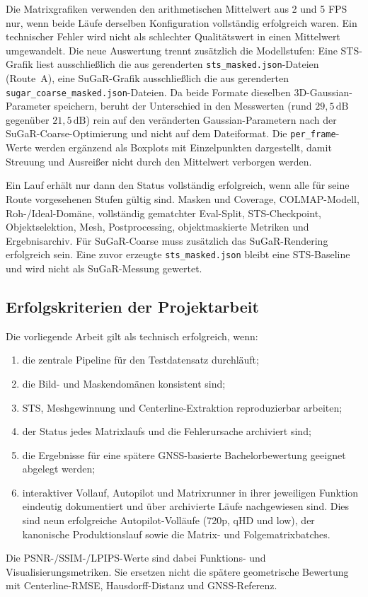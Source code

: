 Die Matrixgrafiken verwenden den arithmetischen Mittelwert aus 2 und 5 FPS nur,
wenn beide Läufe derselben Konfiguration vollständig erfolgreich waren. Ein
technischer Fehler wird nicht als schlechter Qualitätswert in einen Mittelwert
umgewandelt. Die neue Auswertung trennt zusätzlich die Modellstufen: Eine
STS-Grafik liest ausschließlich die aus  gerenderten
\texttt{sts\_masked.json}-Dateien (Route~A), eine SuGaR-Grafik ausschließlich die
aus  gerenderten \texttt{sugar\_coarse\_masked.json}-Dateien. Da
beide Formate dieselben 3D-Gaussian-Parameter speichern, beruht der Unterschied
in den Messwerten (rund $29{,}5\,\mathrm{dB}$ gegenüber $21{,}5\,\mathrm{dB}$)
rein auf den veränderten Gaussian-Parametern nach der SuGaR-Coarse-Optimierung und
nicht auf dem Dateiformat. Die \texttt{per\_frame}-Werte werden ergänzend als
Boxplots mit Einzelpunkten dargestellt, damit Streuung und Ausreißer nicht durch
den Mittelwert verborgen werden.

Ein Lauf erhält nur dann den Status vollständig erfolgreich, wenn alle für
seine Route vorgesehenen Stufen gültig sind. Masken und Coverage,
COLMAP-Modell, Roh-/Ideal-Domäne, vollständig gematchter Eval-Split,
STS-Checkpoint, Objektselektion, Mesh, Postprocessing, objektmaskierte Metriken
und Ergebnisarchiv. Für SuGaR-Coarse muss zusätzlich das SuGaR-Rendering
erfolgreich sein. Eine zuvor erzeugte \texttt{sts\_masked.json} bleibt eine
STS-Baseline und wird nicht als SuGaR-Messung gewertet.

\subsection{Erfolgskriterien der Projektarbeit}

Die vorliegende Arbeit gilt als technisch erfolgreich, wenn:

\begin{enumerate}
  \item die zentrale Pipeline für den Testdatensatz durchläuft;
  \item die Bild- und Maskendomänen konsistent sind;
  \item STS, Meshgewinnung und Centerline-Extraktion reproduzierbar arbeiten;
  \item der Status jedes Matrixlaufs und die Fehlerursache archiviert sind;
  \item die Ergebnisse für eine spätere GNSS-basierte Bachelorbewertung
        geeignet abgelegt werden;
    \item interaktiver Vollauf, Autopilot und Matrixrunner in ihrer
      jeweiligen Funktion eindeutig dokumentiert und über archivierte Läufe
      nachgewiesen sind. Dies sind neun erfolgreiche Autopilot-Volläufe (720p, qHD und
      low), der kanonische Produktionslauf sowie die Matrix- und
      Folgematrixbatches.
\end{enumerate}

Die PSNR-/SSIM-/LPIPS-Werte sind dabei Funktions- und Visualisierungsmetriken.
Sie ersetzen nicht die spätere geometrische Bewertung mit Centerline-RMSE,
Hausdorff-Distanz und GNSS-Referenz.
